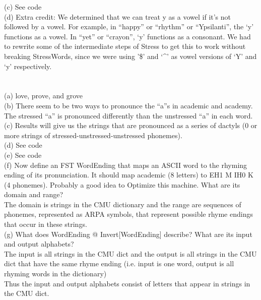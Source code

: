 \documentclass[11pt]{article} %
\begin{document}
(c) See code\\

(d) Extra credit: We determined that we can treat y as a vowel if it's not followed by a vowel. For example, in ``happy” or ``rhythm” or ``Ypsilanti”, the ‘y’ functions as a vowel. In ``yet” or ``crayon”, ‘y’ functions as a consonant. We had to rewrite some of the intermediate steps of Stress to get this to work without breaking StressWords, since we were using '\$’ and ‘\string^’ as vowel versions of ‘Y’ and ‘y’ respectively.\\

\newpage

\section{}

(a) love, prove, and grove\\

(b) There seem to be two ways to pronounce the ``a”s in academic and academy. The stressed ``a” is pronounced differently than the unstressed ``a” in each word.\\

(c) Results will give us the strings that are pronounced as a series of dactyls (0 or more strings of stressed-unstressed-unstressed phonemes).\\

(d) See code\\

(e) See code\\

(f) Now define an FST WordEnding that maps an ASCII word to the rhyming ending of its pronunciation. It should map academic (8 letters) to EH1 M IH0 K (4 phonemes). Probably a good idea to Optimize this machine. What are its domain and range?\\

The domain is strings in the CMU dictionary and the range are sequences of phonemes, represented as ARPA symbols, that represent possible rhyme endings that occur in these strings. \\

(g) What does WordEnding @ Invert[WordEnding] describe? What are its input and output alphabets? \\

The input is all strings in the CMU dict and the output is all strings in the CMU dict that have the same rhyme ending (i.e. input is one word, output is all rhyming words in the dictionary)\\
Thus the input and output alphabets consist of letters that appear in strings in the CMU dict.\\
\end{document}
